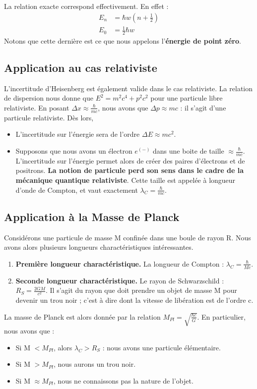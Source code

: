 \documentclass[../Notes de cours]{subfiles}
\begin{document}
La relation exacte correspond effectivement. En effet :
\begin{align}
\label{Energie quantifiée OH}
E_n &= \hbar w \left( n + \frac{1}{2} \right)\\
E_0 &= \frac{1}{2} \hbar w
\end{align}
Notons que cette dernière est ce que nous appelons l'\textbf{énergie de point zéro}.
\subsection{Application au cas relativiste}
L'incertitude d'Heisenberg est également valide dans le cas relativiste. La relation de dispersion nous donne que $E^2 = m^2 c^4 + p^2 c^2$ pour une particule libre relativiste. En posant $\Delta x \approx \frac{\hbar}{mc}$, nous avons que $\Delta p \approx mc$ : il s'agit d'une particule relativiste. Dès lors,
\begin{itemize}
\item L'incertitude sur l'énergie sera de l'ordre $\Delta E \approx mc^2$.
\item Supposons que nous avons un électron $e^(-)$ dans une boite de taille $\approx \frac{\hbar}{mc}$. L'incertitude sur l'énergie permet alors de créer des paires d'électrons et de positrons. \textbf{La notion de particule perd son sens dans le cadre de la mécanique quantique relativiste}. Cette taille est appelée à longueur d'onde de Compton, et vaut exactement $\lambda_C = \frac{\hbar}{mc}$.
\end{itemize}

\subsection{Application à la Masse de Planck}
Considérons une particule de masse M confinée dans une boule de rayon R.
Nous avons alors plusieurs longueurs charactéristiques intéressantes.
\begin{enumerate}
\item \textbf{Première longueur charactéristique.} La longueur de Compton : $\lambda_C = \frac{\hbar}{Mc}$.
\item \textbf{Seconde longueur charactéristique.} Le rayon de Schwarzschild : $R_S = \frac{2GM}{c^2}$. Il s'agit du rayon que doit prendre un objet de masse M pour devenir un trou noir ; c'est à dire dont la vitesse de libération est de l'ordre c.
\end{enumerate}

La masse de Planck est alors donnée par la relation $M_{Pl} = \sqrt{\frac{\hbar c}{G}}$. En particulier, nous avons que :
\begin{itemize}
\item Si M $< M_{Pl}$, alors $\lambda_C > R_S$ : nous avons une particule élémentaire.
\item Si M $> M_{Pl}$, nous aurons un trou noir.
\item Si M $\approx M_{Pl}$, nous ne connaissons pas la nature de l'objet.
\end{itemize}
\end{document}
